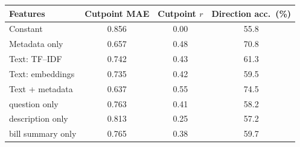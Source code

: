 \begin{tabular}{lccc}
\toprule
Features & Cutpoint MAE & Cutpoint $r$ & Direction acc.\ (\%) \\
\midrule
Constant & 0.856 & 0.00 & 55.8 \\
Metadata only & 0.657 & 0.48 & 70.8 \\
Text: TF--IDF & 0.742 & 0.43 & 61.3 \\
Text: embeddings & 0.735 & 0.42 & 59.5 \\
Text + metadata & 0.637 & 0.55 & 74.5 \\
\quad question only & 0.763 & 0.41 & 58.2 \\
\quad description only & 0.813 & 0.25 & 57.2 \\
\quad bill summary only & 0.765 & 0.38 & 59.7 \\
\bottomrule
\end{tabular}
